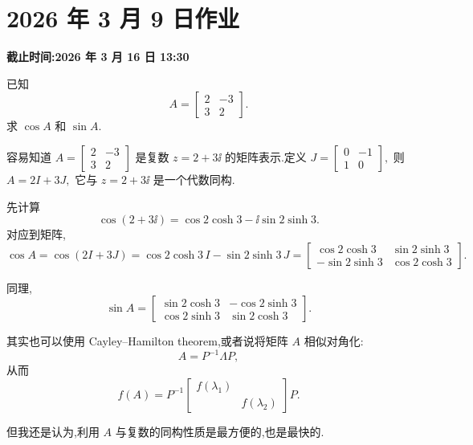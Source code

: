 \section*{2026 年 3 月 9 日作业}
{}
\noindent\textbf{截止时间:2026 年 3 月 16 日 13:30}
\setcounter{problem}{0}

\begin{problem}
已知
\[
A=
\begin{bmatrix}
2 & -3\\
3 & 2
\end{bmatrix}.
\]
求 $\cos A$ 和 $\sin A$.
\begin{solution}
容易知道
$
A=\begin{bmatrix}2&-3\\3&2\end{bmatrix}
$
是复数 $z=2+3\ii$ 的矩阵表示.定义
$
J=\begin{bmatrix}0&-1\\1&0\end{bmatrix},
$
则
$
A=2I+3J,
$
它与 $z=2+3\ii$ 是一个代数同构.

先计算
\[
\cos(2+3\ii)=\cos2\cosh3-\ii\sin2\sinh3.
\]
对应到矩阵,
\[
\cos A=\cos(2I+3J)=\cos2\cosh3\,I-\sin2\sinh3\,J
=\begin{bmatrix}
\cos2\cosh3 & \sin2\sinh3\\
-\sin2\sinh3 & \cos2\cosh3
\end{bmatrix}.
\]

同理,
\[
\sin A
=\begin{bmatrix}
\sin2\cosh3 & -\cos2\sinh3\\
\cos2\sinh3 & \sin2\cosh3
\end{bmatrix}.
\]
\end{solution}
\end{problem}

\begin{solnote}
    其实也可以使用 Cayley–Hamilton theorem,或者说将矩阵 $A$ 相似对角化:
    \[
        A = P^{-1} \Lambda P,
    \]
    从而 \[f(A) = P^{-1}\begin{bmatrix}
        f(\lambda_1) & \\
         & f(\lambda_2)
    \end{bmatrix}P.\]

    但我还是认为,利用 $A$ 与复数的同构性质是最方便的,也是最快的.
\end{solnote}

